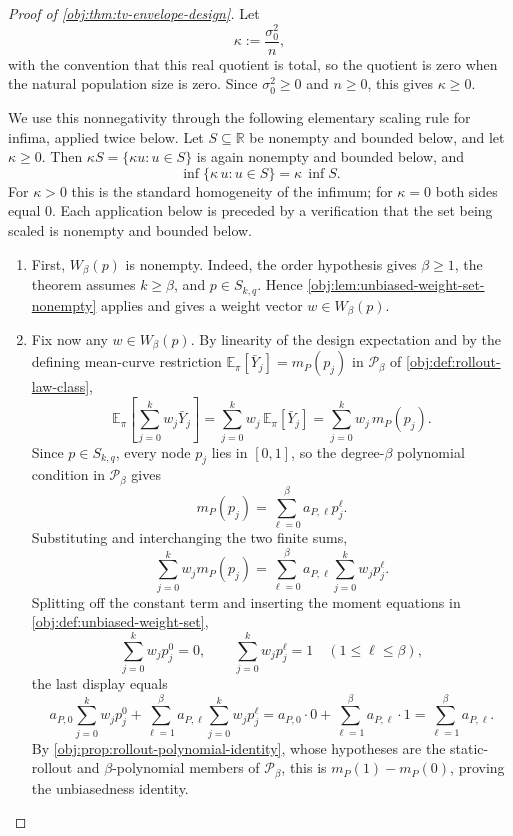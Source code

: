 \begin{proof}[Proof of \cref{obj:thm:tv-envelope-design}]
Let
\[
\kappa:=\frac{\sigma_0^2}{n},
\]
with the convention that this real quotient is total, so the quotient is zero when the natural population size is zero. Since \(\sigma_0^2\ge0\) and \(n\ge0\), this gives \(\kappa\ge0\). %

We use this nonnegativity through the following elementary scaling rule for infima, applied twice below. Let \(S\subseteq\mathbb R\) be nonempty and bounded below, and let \(\kappa\ge0\). Then \(\kappa S=\{\kappa u:u\in S\}\) is again nonempty and bounded below, and
\[
\inf\{\kappa\,u:u\in S\}=\kappa\,\inf S .
\]
For \(\kappa>0\) this is the standard homogeneity of the infimum; for \(\kappa=0\) both sides equal \(0\). Each application below is preceded by a verification that the set being scaled is nonempty and bounded below. %

\begin{enumerate}
\item
First, \(W_\beta(p)\) is nonempty. Indeed, the order hypothesis gives \(\beta\ge 1\), the theorem assumes \(k\ge \beta\), and \(p\in S_{k,q}\). Hence \cref{obj:lem:unbiased-weight-set-nonempty} applies and gives a weight vector \(w\in W_\beta(p)\). %

\item
Fix now any \(w\in W_\beta(p)\). By linearity of the design expectation and by the defining mean-curve restriction \(\mathbb E_\pi[\bar Y_j]=m_P(p_j)\) in \(\mathcal P_\beta\) of \cref{obj:def:rollout-law-class},
\[
\mathbb E_\pi\!\left[\sum_{j=0}^k w_j\bar Y_j\right]
=
\sum_{j=0}^k w_j\,\mathbb E_\pi[\bar Y_j]
=
\sum_{j=0}^k w_j\,m_P(p_j).
\]
Since \(p\in S_{k,q}\), every node \(p_j\) lies in \([0,1]\), so the degree-\(\beta\) polynomial condition in \(\mathcal P_\beta\) gives
\[
m_P(p_j)=\sum_{\ell=0}^{\beta} a_{P,\ell}p_j^\ell .
\]
Substituting and interchanging the two finite sums,
\[
\sum_{j=0}^k w_jm_P(p_j)
=
\sum_{\ell=0}^{\beta}
a_{P,\ell}\sum_{j=0}^k w_jp_j^\ell .
\]
Splitting off the constant term and inserting the moment equations in \cref{obj:def:unbiased-weight-set},
\[
\sum_{j=0}^k w_jp_j^0=0,
\qquad
\sum_{j=0}^k w_jp_j^\ell=1
\quad(1\le \ell\le \beta),
\]
the last display equals
\[
a_{P,0}\sum_{j=0}^k w_jp_j^0
+
\sum_{\ell=1}^{\beta}a_{P,\ell}\sum_{j=0}^k w_jp_j^\ell
=
a_{P,0}\cdot 0+\sum_{\ell=1}^{\beta}a_{P,\ell}\cdot 1
=
\sum_{\ell=1}^{\beta}a_{P,\ell}.
\]
By \cref{obj:prop:rollout-polynomial-identity}, whose hypotheses are the static-rollout and \(\beta\)-polynomial members of \(\mathcal P_\beta\), this is \(m_P(1)-m_P(0)\), proving the unbiasedness identity. %


\end{enumerate}
\end{proof}
